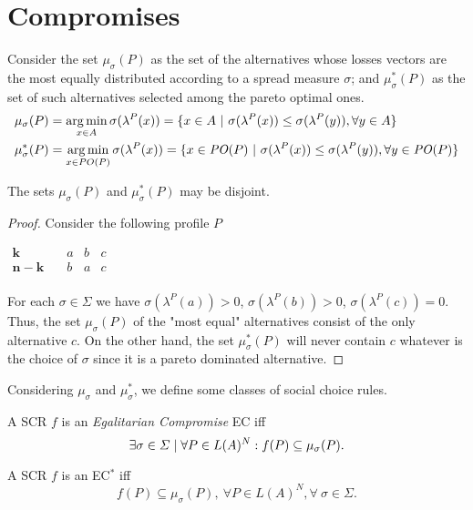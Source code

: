 \documentclass[version=3.21, pagesize, notitlepage, twoside=off, bibliography=totoc, DIV=calc, fontsize=12pt, a4paper]{scrartcl}
\newcommand{\paretopt}{\mathit{PO}}
\newcommand{\musigma}{\mu_{\sigma}}
\newcommand{\mustar}{\mu_{\sigma}^*}
\begin{document}
\section{Compromises}
Consider the set $\musigma(P)$ as the set of the alternatives whose losses vectors are the most equally distributed according to a spread measure $\sigma$; and $\mustar(P)$ as the set of such alternatives selected among the pareto optimal ones. 
\begin{align}
	\musigma(P) & = \argmin_{x \in A} \sigma(\lambda^P(x)) = \{ x \in A \ | \ \sigma (\lambda^P(x))\leq \sigma (\lambda^P(y)), \forall y \in A \} \\
	\mustar(P) & = \argmin_{x \in PO(P)} \sigma(\lambda^P(x)) = \{ x \in \paretopt(P) \ | \ \sigma (\lambda^P(x))\leq \sigma (\lambda^P(y)), \forall y \in \paretopt(P) \} 
\end{align}
\begin{proposition} \label{prop:disjoint}
	The sets $\musigma(P)$ and $\mustar(P)$ may be disjoint.
\end{proposition}
	\begin{proof} Consider the following profile $P$
		\begin{center}
			$
			\begin{array}{cccc}
			\mathbf{k} \quad &a&b&c\\
			\mathbf{n-k} \quad &b&a&c\\
			\end{array}
			$
		\end{center}
		For each $\sigma \in \Sigma$ we have $\sigma(\lambda^P(a))>0$, $\sigma(\lambda^P(b))>0$, $\sigma(\lambda^P(c))=0$. Thus, the set $\musigma(P)$ of the "most equal" alternatives consist of the only alternative $c$. On the other hand, the set $\mustar(P)$ will never contain $c$ whatever is the choice of $\sigma$ since it is a pareto dominated alternative.
	\end{proof}

Considering $\musigma$ and $\mustar$, we define some classes of social choice rules.
\begin{definition} A SCR $f$ is an \textit{Egalitarian Compromise} EC iff \[\exists \sigma \in \Sigma \suchthat \forall P \in L(A)^N: f(P) \subseteq \musigma(P).\]
\end{definition}

\begin{definition} A SCR $f$ is an EC$^*$ iff \[f(P) \subseteq \musigma(P), \ \forall P \in L(A)^N, \forall \ \sigma \in \Sigma.\]
\end{definition}
\end{document}
